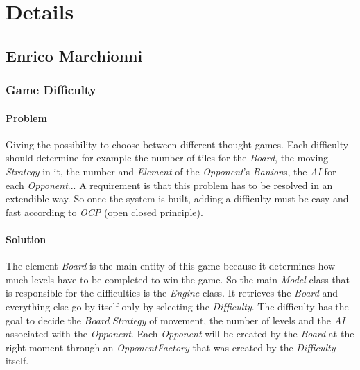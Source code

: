 \documentclass[12pt, a4paper]{report}
\begin{document}
\section{Details}

    \subsection*{Enrico Marchionni}

        \subsubsection{Game Difficulty}

            \paragraph{Problem}
            
            Giving the possibility to choose between different thought games.
            Each difficulty should determine for example the number of tiles for the \emph{Board}, the moving \emph{Strategy} in it,
            the number and \emph{Element} of the \emph{Opponent}'s \emph{Banion}s, the \emph{AI} for each \emph{Opponent}...
            A requirement is that this problem has to be resolved in an extendible way.
            So once the system is built, adding a difficulty must be easy and fast according to \emph{OCP} (open closed principle).

            \paragraph{Solution}

            The element \emph{Board} is the main entity of this game because it determines how much
            levels have to be completed to win the game. So the main \emph{Model} class that is responsible for
            the difficulties is the \emph{Engine} class. It retrieves the \emph{Board} and everything else go by itself
            only by selecting the \emph{Difficulty}. The difficulty has the goal to decide the \emph{Board} \emph{Strategy} of
            movement, the number of levels and the \emph{AI} associated with the \emph{Opponent}. Each \emph{Opponent} will
            be created by the \emph{Board} at the right moment through an \emph{OpponentFactory} that was created by the \emph{Difficulty}
            itself.
\end{document}
